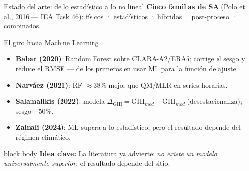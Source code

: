 \documentclass[aspectratio=169,11pt]{beamer}
\newcommand{\clave}[1]{%
  \begin{beamercolorbox}[wd=\linewidth,sep=6pt,rounded=true]{block body}%
    \footnotesize\textbf{\color{primary}Idea clave: }#1%
  \end{beamercolorbox}}
\begin{document}
\begin{frame}{Estado del arte: de lo estadístico a lo no lineal}
  \footnotesize
  \textbf{Cinco familias de SA} (Polo et al., 2016 — IEA Task 46): físicos · estadísticos · híbridos · post-proceso · combinados.
  \vspace{0.3em}
  \begin{block}{El giro hacia Machine Learning}
    \scriptsize
    \begin{itemize}
      \item \textbf{Babar (2020)}: Random Forest sobre CLARA-A2/ERA5; corrige el sesgo y reduce el RMSE — de los primeros en usar ML para la función de ajuste.
      \item \textbf{Narváez (2021)}: RF $\approx 38\%$ mejor que QM/MLR en series horarias.
      \item \textbf{Salamalikis (2022)}: modela $\Delta_{\mathrm{GHI}} = \mathrm{GHI}_{med}-\mathrm{GHI}_{mod}$ (desestacionaliza); sesgo $-50\%$.
      \item \textbf{Zainali (2024)}: ML supera a lo estadístico, pero el resultado depende del régimen climático.
    \end{itemize}
  \end{block}
  \clave{La literatura ya advierte: \emph{no existe un modelo universalmente superior}; el resultado depende del sitio.}
\end{frame}
\end{document}
